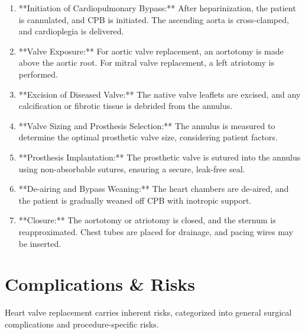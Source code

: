 \begin{enumerate}
  \item **Initiation of Cardiopulmonary Bypass:** After heparinization, the patient is cannulated, and CPB is initiated. The ascending aorta is cross-clamped, and cardioplegia is delivered.
  
  \item **Valve Exposure:** For aortic valve replacement, an aortotomy is made above the aortic root. For mitral valve replacement, a left atriotomy is performed.
  
  \item **Excision of Diseased Valve:** The native valve leaflets are excised, and any calcification or fibrotic tissue is debrided from the annulus.
  
  \item **Valve Sizing and Prosthesis Selection:** The annulus is measured to determine the optimal prosthetic valve size, considering patient factors.
  
  \item **Prosthesis Implantation:** The prosthetic valve is sutured into the annulus using non-absorbable sutures, ensuring a secure, leak-free seal.
  
  \item **De-airing and Bypass Weaning:** The heart chambers are de-aired, and the patient is gradually weaned off CPB with inotropic support.
  
  \item **Closure:** The aortotomy or atriotomy is closed, and the sternum is reapproximated. Chest tubes are placed for drainage, and pacing wires may be inserted.
\end{enumerate}

\section*{Complications \& Risks}
Heart valve replacement carries inherent risks, categorized into general surgical complications and procedure-specific risks.

